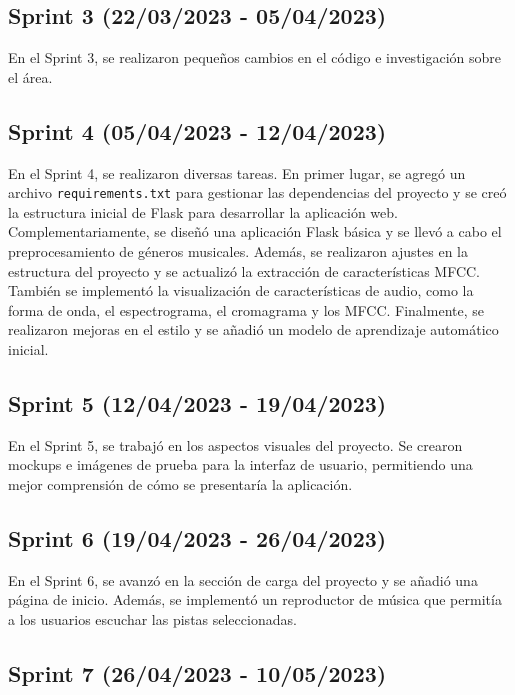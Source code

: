 \subsection{Sprint 3 (22/03/2023 - 05/04/2023)}

En el Sprint 3, se realizaron pequeños cambios en el código e investigación sobre el área.

\subsection{Sprint 4 (05/04/2023 - 12/04/2023)}

En el Sprint 4, se realizaron diversas tareas. En primer lugar, se agregó un archivo \texttt{requirements.txt} para gestionar las dependencias del proyecto y se creó la estructura inicial de Flask para desarrollar la aplicación web. Complementariamente, se diseñó una aplicación Flask básica y se llevó a cabo el preprocesamiento de géneros musicales. Además, se realizaron ajustes en la estructura del proyecto y se actualizó la extracción de características MFCC. También se implementó la visualización de características de audio, como la forma de onda, el espectrograma, el cromagrama y los MFCC. Finalmente, se realizaron mejoras en el estilo y se añadió un modelo de aprendizaje automático inicial.

\subsection{Sprint 5 (12/04/2023 - 19/04/2023)}

En el Sprint 5, se trabajó en los aspectos visuales del proyecto. Se crearon mockups e imágenes de prueba para la interfaz de usuario, permitiendo una mejor comprensión de cómo se presentaría la aplicación.

\subsection{Sprint 6 (19/04/2023 - 26/04/2023)}

En el Sprint 6, se avanzó en la sección de carga del proyecto y se añadió una página de inicio. Además, se implementó un reproductor de música que permitía a los usuarios escuchar las pistas seleccionadas.

\subsection{Sprint 7 (26/04/2023 - 10/05/2023)}


